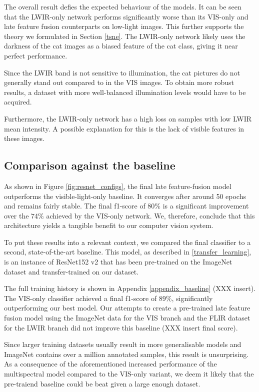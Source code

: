 \documentclass{l4proj}
\begin{document}
The overall result defies the expected behaviour of the models. It can be seen that the LWIR-only network performs significantly worse than its VIS-only and late feature fusion counterparts on low-light images. This further supports the theory we formulated in Section \ref{tsne}. The LWIR-only network likely uses the darkness of the cat images as a biased feature of the cat class, giving it near perfect performance.

Since the LWIR band is not sensitive to illumination, the cat pictures do not generally stand out compared to in the VIS images. To obtain more robust results, a dataset with more well-balanced illumination levels would have to be acquired.

Furthermore, the LWIR-only network has a high loss on samples with low LWIR mean intensity. A possible explanation for this is the lack of visible features in these images. 

\subsection{Comparison against the baseline}

As shown in Figure \ref{fig:resnet_configs}, the final late feature-fusion model outperforms the visible-light-only baseline. It converges after around 50 epochs and remains fairly stable. The final f1-score of $80\%$ is a significant improvement over the $74\%$ achieved by the VIS-only network. We, therefore, conclude that this architecture yields a tangible benefit to our computer vision system.

To put these results into a relevant context, we compared the final classifier to a second, state-of-the-art baseline. This model, as described in \ref{transfer_learning}, is an instance of ResNet152 v2 that has been pre-trained on the ImageNet dataset and transfer-trained on our dataset.

The full training history is shown in Appendix \ref{appendix_baseline} (XXX insert). The VIS-only classifier achieved a final f1-score of $89\%$, significantly outperforming our best model. Our attempts to create a pre-trained late feature fusion model using the ImageNet data for the VIS branch and the FLIR dataset for the LWIR branch did not improve this baseline (XXX insert final score).

Since larger training datasets usually result in more generalisable models and ImageNet contains over a million annotated samples, this result is unsurprising. As a consequence of the aforementioned increased performance of the multispectral model compared to the VIS-only variant, we deem it likely that the pre-traiend baseline could be beat given a large enough dataset.
\end{document}
